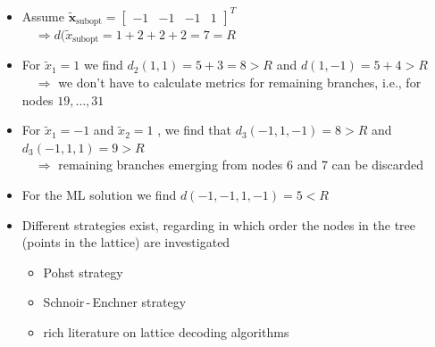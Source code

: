 \documentclass[a4paper, 10pt]{article}
\begin{document}
\newpage

\begin{itemize}
	\item Assume $\tilde{\mathbf{x}}_{\text{subopt}} = \begin{bmatrix} -1 & -1 & -1 & 1	\end{bmatrix}^T $ \\ $ \quad \Rightarrow d(\tilde{x}_{\text{subopt}} = 1 + 2 + 2 + 2 = 7 = R $
	\item For $\tilde{x}_1 = 1 $ we find $ d_2(1,1) = 5 + 3 = 8 > R $ and $ d(1,-1) = 5 + 4 > R $ \\ $ \quad\Rightarrow $ we don't have to calculate metrics for remaining branches, i.e., for nodes $19, \ldots ,31 $
	\item For $ \tilde{x}_1 = -1 $ and $ \tilde{x}_2 = 1$ , we find that $d_3(-1, 1, -1) = 8 > R $ and $ d_3(-1, 1, 1) = 9 > R$ \\ $ \quad\Rightarrow $ remaining branches emerging from nodes 6 and 7 can be discarded
	\item For the ML solution we find $d(-1, -1, 1, -1) = 5 < R $
	\item Different strategies exist, regarding in which order the nodes in the tree (points in the lattice) are investigated
	\begin{itemize}
		\item Pohst strategy
		\item Schnoir\,-\,Enchner strategy
		\item rich literature on lattice decoding algorithms
	\end{itemize}
\end{itemize}
\end{document}

